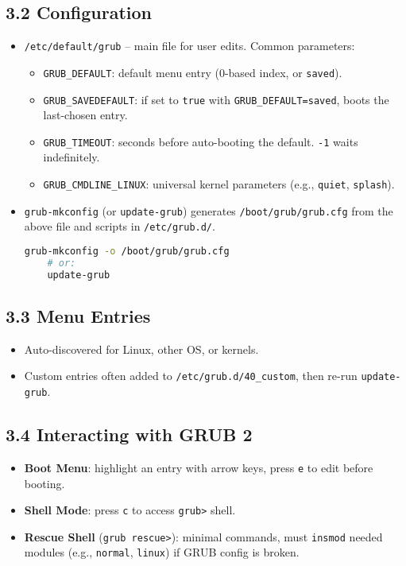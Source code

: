 \documentclass[12pt,a4paper]{report}
\begin{document}
\subsection*{3.2 Configuration}
\begin{itemize}
    \item \texttt{/etc/default/grub} – main file for user edits. Common parameters:  
    \begin{itemize}
        \item \texttt{GRUB\_DEFAULT}: default menu entry (0-based index, or \texttt{saved}).  
        \item \texttt{GRUB\_SAVEDEFAULT}: if set to \texttt{true} with \texttt{GRUB\_DEFAULT=saved}, boots the last-chosen entry.  
        \item \texttt{GRUB\_TIMEOUT}: seconds before auto-booting the default. \texttt{-1} waits indefinitely.  
        \item \texttt{GRUB\_CMDLINE\_LINUX}: universal kernel parameters (e.g., \texttt{quiet}, \texttt{splash}).  
    \end{itemize}
    \item \texttt{grub-mkconfig} (or \texttt{update-grub}) generates \texttt{/boot/grub/grub.cfg} from the above file and scripts in \texttt{/etc/grub.d/}.  
    \begin{lstlisting}[language=bash]
    grub-mkconfig -o /boot/grub/grub.cfg
    # or:
    update-grub
    \end{lstlisting}
\end{itemize}

\subsection*{3.3 Menu Entries}
\begin{itemize}
    \item Auto-discovered for Linux, other OS, or kernels.  
    \item Custom entries often added to \texttt{/etc/grub.d/40\_custom}, then re-run \texttt{update-grub}.
\end{itemize}

\subsection*{3.4 Interacting with GRUB 2}
\begin{itemize}
    \item \textbf{Boot Menu}: highlight an entry with arrow keys, press \texttt{e} to edit before booting.  
    \item \textbf{Shell Mode}: press \texttt{c} to access \texttt{grub>} shell.  
    \item \textbf{Rescue Shell} (\texttt{grub rescue>}): minimal commands, must \texttt{insmod} needed modules (e.g., \texttt{normal}, \texttt{linux}) if GRUB config is broken.
\end{itemize}
\end{document}
